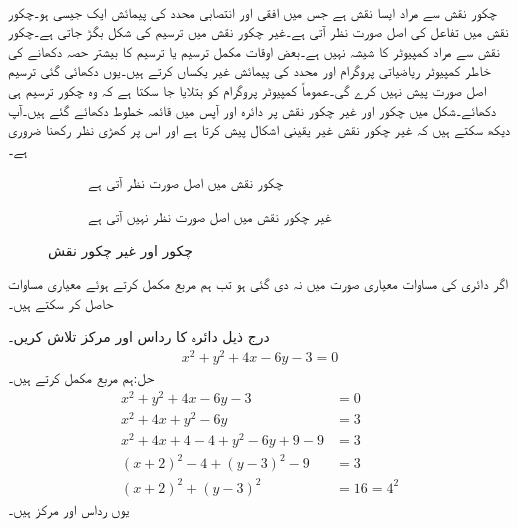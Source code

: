  \quad {}\\
چکور نقش سے مراد ایسا نقش ہے جس میں افقی اور انتصابی محدد کی پیمائش ایک جیسی ہو۔چکور نقش میں تفاعل کی اصل صورت نظر آتی ہے۔غیر چکور نقش میں ترسیم کی شکل بگڑ جاتی ہے۔چکور نقش سے مراد کمپیوٹر کا شیشہ نہیں ہے۔بعض اوقات مکمل ترسیم یا ترسیم کا بیشتر حصہ دکھانے کی خاطر کمپیوٹر ریاضیاتی پروگرام  اور  محدد کی پیمائش غیر یکساں کرتے ہیں۔یوں دکھائی گئی ترسیم اصل صورت پیش نہیں کرے گی۔عموماً کمپیوٹر پروگرام کو بتلایا جا سکتا ہے کہ وہ چکور ترسیم ہی دکھائے۔شکل  میں چکور اور غیر چکور نقش پر دائرہ اور آپس میں قائمہ خطوط  دکھائے گئے ہیں۔آپ دیکھ سکتے ہیں کہ غیر چکور نقش غیر یقینی اشکال پیش کرتا ہے اور اس پر کھڑی نظر رکھنا ضروری ہے۔
\begin{figure}
\centering
\begin{subfigure}{0.5\textwidth}
\centering
{}
\caption{چکور نقش میں اصل صورت نظر آتی ہے}
\end{subfigure}%
\begin{subfigure}{0.5\textwidth}
\centering
{}
\caption{غیر چکور نقش میں اصل صورت نظر نہیں آتی ہے}
\end{subfigure}%
\caption{چکور اور غیر چکور نقش}
\label{شکل_ابتدا_چکور_غیر_چکر_نقش}
\end{figure}

اگر دائری کی مساوات معیاری صورت میں نہ دی گئی ہو تب ہم مربع مکمل کرتے ہوئے معیاری مساوات حاصل کر سکتے ہیں۔

درج ذیل دائرہ کا رداس اور مرکز تلاش کریں۔
\begin{align*}
x^2+y^2+4x-6y-3=0
\end{align*}
حل:\quad ہم مربع مکمل کرتے ہیں۔
\begin{align*}
x^2+y^2+4x-6y-3&=0\\
x^2+4x+y^2-6y&=3\\
x^2+4x+4-4+y^2-6y+9-9&=3\\
(x+2)^2-4+(y-3)^2-9&=3\\
(x+2)^2+(y-3)^2&=16=4^2
\end{align*}
یوں رداس  اور مرکز  ہیں۔

